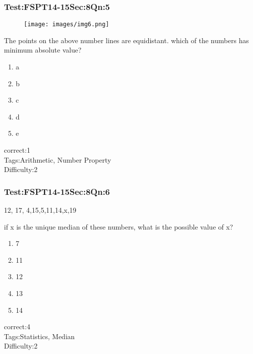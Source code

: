 \documentclass[]{beamer}
\begin{document}
    \begin{frame}
	    \frametitle{Test:FSPT14-15\hspace{2mm}Sec:8\hspace{2mm}Qn:5}
	    \begin{figure}
	    \begin{center}
	    	\texttt{[image: images/img6.png]}
	    \end{center}
	    \end{figure}
	    The points on the above number lines are equidistant. which of the numbers has minimum absolute value?
	    \begin{enumerate}
	        \item
	            a
	        \item
	            b
	        \item
	            c
	        \item
	            d
	        \item
	            e
	    \end{enumerate}
	    correct:1  \\   
	    Tags:Arithmetic, Number Property    \\
	    Difficulty:2   \\
    \end{frame}
    \begin{frame}
	    \frametitle{Test:FSPT14-15\hspace{2mm}Sec:8\hspace{2mm}Qn:6}
	    \begin{center}
	    12, 17, 4,15,5,11,14,x,19
	    \end{center}
	    if x is the unique median of these numbers, what is the possible value of x?
	    \begin{enumerate}
	        \item
	            7
	        \item
	           11
	        \item
	           12
	        \item
	            13
	        \item
	            14
	    \end{enumerate}
	    correct:4  \\   
	    Tags:Statistics, Median    \\
	    Difficulty:2   \\
    \end{frame}
\end{document}
